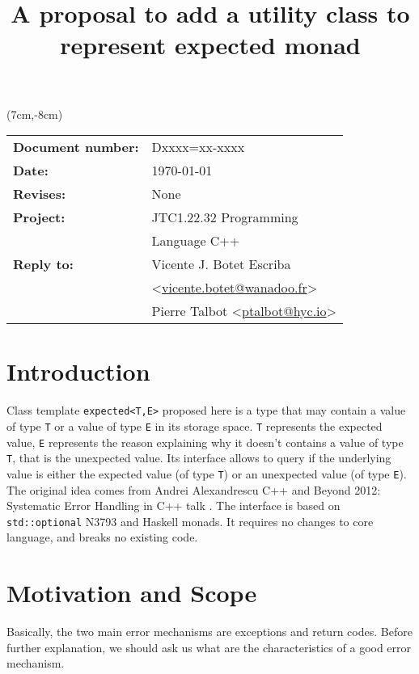 \documentclass[a4paper,10pt]{article}
\title{A proposal to add a utility class to represent expected monad}
\author{}
\date{}
\newcommand{\cpp}[1]{\lstinline{#1}}
\begin{document}
\maketitle
\begin{textblock*}{9cm}(7cm,-8cm)
\begin{tabular}{l l}
\textbf{Document number:} & Dxxxx=xx-xxxx \\
\textbf{Date:}  & \today \\
\textbf{Revises:} & None \\
\textbf{Project:} & JTC1.22.32 Programming \\
 & Language C++ \\
\textbf{Reply to:} & Vicente J. Botet Escriba \\
 & <\href{mailto:vicente.botet@wanadoo.fr}{vicente.botet@wanadoo.fr}> \\
 & Pierre Talbot <\href{mailto:ptalbot@hyc.io}{ptalbot@hyc.io}>
\end{tabular}
\end{textblock*}

\vspace{-6em}
\setcounter{tocdepth}{1}
\tableofcontents

\section{Introduction}

Class template \cpp{expected<T,E>} proposed here is a type that may contain a value of type \cpp{T} or a value of type \cpp{E} in its storage space. \cpp{T} represents the expected value, \cpp{E} represents the reason explaining why it doesn't contains a value of type \cpp{T}, that is the unexpected value. Its interface allows to query if the underlying value is either the expected value (of type \cpp{T}) or an unexpected value (of type \cpp{E}). The original idea comes from Andrei Alexandrescu C++ and Beyond 2012: Systematic Error Handling in C++ talk \cite{AlexandrescuExpected}. The interface is based on \cpp{std::optional} N3793 \cite{OptionalRev5} and Haskell monads. It requires no changes to core language, and breaks no existing code.

\section{Motivation and Scope}

Basically, the two main error mechanisms are exceptions and return codes. Before further explanation, we should ask us what are the characteristics of a good error mechanism.
\end{document}
